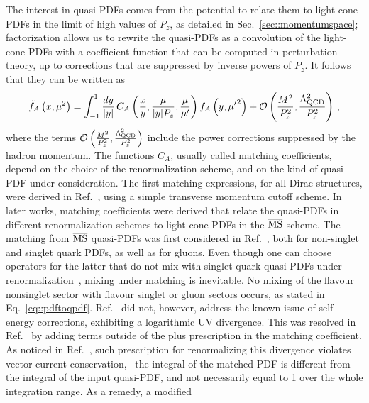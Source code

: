 The interest in quasi-PDFs comes from the potential to relate them to light-cone
PDFs in the limit of high values of $P_z$, as detailed in Sec.~\ref{sec::momentumspace};
factorization allows us to rewrite the quasi-PDFs as a convolution of the
light-cone PDFs with a coefficient function that can be computed in perturbation
theory, up to corrections that are suppressed by inverse powers of $P_z$.
It follows that they can be written as
\begin{align}
	\label{eq::pdftoqpdf}                                                                             
	\tilde{f}_A\left( x , {\mu}^2 \right) =                                                               
	\int_{-1}^{1} \frac{dy}{|y|}\, C_A\left(\frac{x}{y},\frac{\mu}{|y|P_z},\frac{\mu}{\mu'} \right)  f_A\left( y, {\mu'}^2\right) 
	+ \mathcal{O}\left( \frac{M^2}{P_z^2},\frac{\Lambda^2_{\text{QCD}}}{P_z^2} \right)\, ,                   
\end{align}
where the terms $\mathcal{O}\left(
\frac{M^2}{P_z^2},\frac{\Lambda^2_{\text{QCD}}}{P_z^2} \right) $ include
the power corrections suppressed by the hadron momentum. The functions $C_A$,
usually called matching coefficients, depend on the choice of the
renormalization scheme, and on the kind of quasi-PDF under consideration. The
first matching expressions, for all Dirac structures, were derived in
Ref.~\cite{Xiong:2013bka}, using a simple transverse momentum cutoff scheme. In
later works, matching coefficients were derived that relate the quasi-PDFs in
different renormalization schemes to light-cone PDFs in the $\overline{\mathrm{MS}}$ scheme. The
matching from $\overline{\mathrm{MS}}$ quasi-PDFs was first considered in
Ref.~\cite{Wang:2017qyg}, both for non-singlet and singlet quark PDFs, as well
as for gluons. Even though one can choose operators for the latter that do not
mix with singlet quark quasi-PDFs under
renormalization~\cite{Zhang:2018diq,Li:2018tpe}, mixing under matching is
inevitable. 
No mixing of the flavour nonsinglet sector with flavour singlet or
gluon sectors occurs, as stated in Eq.~\eqref{eq::pdftoqpdf}. Ref.~\cite{Wang:2017qyg} did not, however, address the
known issue of self-energy corrections, exhibiting a logarithmic UV divergence.
This was resolved in Ref.~\cite{Izubuchi:2018srq} by adding terms outside of the
plus prescription in the matching coefficient. As noticed in
Ref.~\cite{Alexandrou:2018pbm}, such prescription for renormalizing this
divergence violates vector current conservation, \ie\ the integral of the
matched PDF is different from the integral of the input quasi-PDF, and not
necessarily equal to 1 over the whole integration range. As a remedy, a modified
